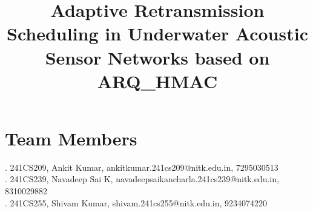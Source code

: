 \documentclass{article}
\title{\textbf{Adaptive Retransmission Scheduling in Underwater Acoustic Sensor Networks
based on ARQ\_HMAC}}
\author{}
\date{}
\begin{document}

\maketitle
\vspace{-3.0em}

\section*{Team Members}

. 241CS209, Ankit Kumar, ankitkumar.241cs209@nitk.edu.in, 7295030513 \\
. 241CS239, Navadeep Sai K, navadeepsaikancharla.241cs239@nitk.edu.in, 8310029882 \\
. 241CS255, Shivam Kumar, shivam.241cs255@nitk.edu.in, 9234074220

\end{document}
